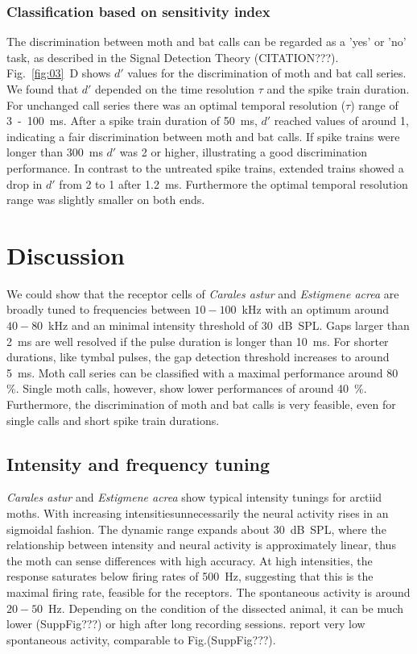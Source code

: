 \documentclass[12pt,a4paper,pdftex]{article}
\newcommand{\species}[1]{\textit{#1}}
\newcommand{\percent}[1]{#1~$\%$}
\begin{document}
\subsubsection*{Classification based on sensitivity index}
The discrimination between moth and bat calls can be regarded as a 'yes' or 'no' task, as described in the Signal Detection Theory (CITATION???).
Fig.~\ref{fig:03}~D shows $d'$ values for the discrimination of moth and bat call series. We found that $d'$ depended on the time resolution $\tau$ and the spike train duration. For unchanged call series there was an optimal temporal resolution ($ \tau $) range of 3~-~100~ms. After a spike train duration of 50~ms, $d'$ reached values of around 1, indicating a fair discrimination between moth and bat calls. If spike trains were longer than 300~ms $d'$ was 2 or higher, illustrating a good discrimination performance. In contrast to the untreated spike trains, extended trains showed a drop in $d'$ from 2 to 1 after 1.2~ms. Furthermore the optimal temporal resolution range was slightly smaller on both ends.

\newpage
\section*{Discussion}
We could show that the receptor cells of \species{Carales astur} and \species{Estigmene acrea} are broadly tuned to frequencies between $10-100$~kHz with an optimum around $40-80$~kHz and an minimal intensity threshold of 30~dB~SPL. Gaps larger than 2~ms are well resolved if the pulse duration is longer than 10~ms. For shorter durations, like tymbal pulses, the gap detection threshold increases to around 5~ms. Moth call series can be classified with a maximal performance around \percent{80}. Single moth calls, however, show lower performances of around \percent{40}. Furthermore, the discrimination of moth and bat calls is very feasible, even for single calls and short spike train durations.

\subsection*{Intensity and frequency tuning}
\species{Carales astur} and \species{Estigmene acrea} show typical  intensity tunings for arctiid moths. With increasing intensitiesunnecessarily the neural activity rises in an sigmoidal fashion. The dynamic range expands about 30~dB~SPL, where the relationship between intensity and neural activity is approximately linear, thus the moth can sense differences with high accuracy. At high intensities, the response saturates below firing rates of 500~Hz, suggesting that this is the maximal firing rate, feasible for the receptors. The spontaneous activity is around $20-50$~Hz. Depending on the condition of the dissected animal, it can be much lower (SuppFig???) or high after long recording sessions. \cite{fullard1998} report very low spontaneous activity, comparable to Fig.(SuppFig???). 
\end{document}
